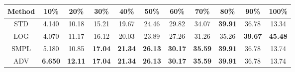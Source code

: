 \documentclass{standalone}
\begin{document}
\begin{tabular}{c|cccccccccc}
      \toprule
      Method & 10\% & 20\% & 30\% & 40\% & 50\% & 60\% & 70\% & 80\% & 90\% & 100\% \\
      \midrule
STD & 4.140 & 10.18 & 15.21 & 19.67 & 24.46 & 29.82 & 34.07 & \textbf{39.91} & 36.78 & 13.34\\
LOG & 4.070 & 11.17 & 16.12 & 20.03 & 23.89 & 27.26 & 31.26 & 35.26 & \textbf{39.67} & \textbf{45.48}\\
SMPL & 5.180 & 10.85 & \textbf{17.04} & \textbf{21.34} & \textbf{26.13} & \textbf{30.17} & \textbf{35.59} & \textbf{39.91} & 36.78 & 13.74\\
ADV & \textbf{6.650} & \textbf{12.11} & \textbf{17.04} & \textbf{21.34} & \textbf{26.13} & \textbf{30.17} & \textbf{35.59} & \textbf{39.91} & 36.78 & 13.74\\
  \bottomrule
\end{tabular}
\end{document}
